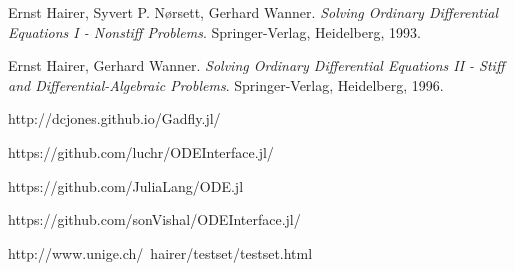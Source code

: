 \documentclass[notitlepage,12pt]{article}
\begin{document}





\begin{thebibliography}{9}
Ernst Hairer, Syvert P. N\o{}rsett, Gerhard Wanner. 
\textit{Solving Ordinary Differential Equations I - Nonstiff Problems}. 
Springer-Verlag, Heidelberg, 1993.

Ernst Hairer, Gerhard Wanner. 
\textit{Solving Ordinary Differential Equations II - Stiff and Differential-Algebraic Problems}. 
Springer-Verlag, Heidelberg, 1996.

http://dcjones.github.io/Gadfly.jl/

https://github.com/luchr/ODEInterface.jl/

https://github.com/JuliaLang/ODE.jl

https://github.com/sonVishal/ODEInterface.jl/

http://www.unige.ch/~hairer/testset/testset.html

\end{thebibliography}

\end{document}
